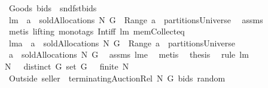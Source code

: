 \begin{isabellebody}
\ {\isachardoublequoteopen}Goods\ bids\ {\isacharequal}{\isacharequal}\ {\isasymUnion}{\isacharparenleft}{\isacharparenleft}snd{\isasymcirc}fst{\isacharparenright}{\isacharbackquote}bids{\isacharparenright}{\isachardoublequoteclose}\isanewline
\isanewline
{}\isamarkupfalse%
\ lm{}{}{\isacharcolon}\ \ {\isachardoublequoteopen}a\ {\isasymin}\ soldAllocations{\isacharprime}{\isacharprime}{\isacharprime}\ N\ G{\isachardoublequoteclose}\ \ {\isachardoublequoteopen}Range\ a\ {\isasymin}\ partitionsUniverse{\isachardoublequoteclose}\ \isanewline
%
\isadelimproof
%
\endisadelimproof
%
\isatagproof
{}\isamarkupfalse%
\ assms\ \isamarkupfalse%
\ {\isacharparenleft}metis\ {\isacharparenleft}lifting{\isacharcomma}\ mono{\isacharunderscore}tags{\isacharparenright}\ Int{\isacharunderscore}iff\ lm{}{}\ mem{\isacharunderscore}Collect{\isacharunderscore}eq{\isacharparenright}%
\endisatagproof
{\isafoldproof}%
%
\isadelimproof
\isanewline
%
\endisadelimproof
\isanewline
{}\isamarkupfalse%
\ lm{}{}a{\isacharcolon}\ \ {\isachardoublequoteopen}a\ {\isasymin}\ soldAllocations\ N\ G{\isachardoublequoteclose}\ \ {\isachardoublequoteopen}Range\ a\ {\isasymin}\ partitionsUniverse{\isachardoublequoteclose}\isanewline
%
\isadelimproof
%
\endisadelimproof
%
\isatagproof
{}\isamarkupfalse%
\ {\isacharminus}\ \isamarkupfalse%
\ {\isachardoublequoteopen}a\ {\isasymin}\ soldAllocations{\isacharprime}{\isacharprime}{\isacharprime}\ N\ G{\isachardoublequoteclose}\ \isamarkupfalse%
\ assms\ lm{}{}e\ \isamarkupfalse%
\ metis\ \isamarkupfalse%
\ {\isacharquery}thesis\ \isamarkupfalse%
\ {\isacharparenleft}rule\ lm{}{}{\isacharparenright}\ \isamarkupfalse%
%
\endisatagproof
{\isafoldproof}%
%
\isadelimproof
\isanewline
%
\endisadelimproof
\isanewline
{}\isamarkupfalse%
\ \ \isanewline
{\isachardoublequoteopen}N\ {\isasymnoteq}\ {\isacharbraceleft}{\isacharbraceright}{\isachardoublequoteclose}\ {\isachardoublequoteopen}distinct\ G{\isachardoublequoteclose}\ {\isachardoublequoteopen}set\ G\ {\isasymnoteq}\ {\isacharbraceleft}{\isacharbraceright}{\isachardoublequoteclose}\ {\isachardoublequoteopen}finite\ N{\isachardoublequoteclose}\ \ \isanewline
{}\ {\isachardoublequoteopen}{\isacharparenleft}Outside{\isacharprime}\ {\isacharbraceleft}seller{\isacharbraceright}{\isacharparenright}\ {\isacharbackquote}\ {\isacharparenleft}terminatingAuctionRel\ N\ G\ {\isacharparenleft}bids{\isacharparenright}\ random{\isacharparenright}\ {\isacharequal}\ \isanewline

\end{isabellebody}
